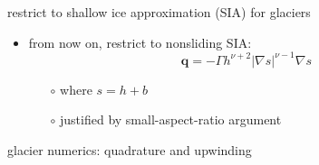 \documentclass[xcolor={dvipsnames}]{beamer}
\newcommand\bq{\mathbf{q}}
\newcommand\grad{\nabla}
\begin{document}
\begin{frame}{restrict to shallow ice approximation (SIA) for glaciers}

\begin{itemize}
\item from now on, restrict to nonsliding SIA:
    $$\bq = - \Gamma h^{\nu+2} |\grad s|^{\nu-1} \grad s$$

    \begin{itemize}
    \item[$\circ$] where $s=h+b$
    \item[$\circ$] justified by small-aspect-ratio argument
    \end{itemize}
\end{itemize}
\end{frame}


\begin{frame}{glacier numerics: quadrature and upwinding}


\end{frame}
\end{document}
